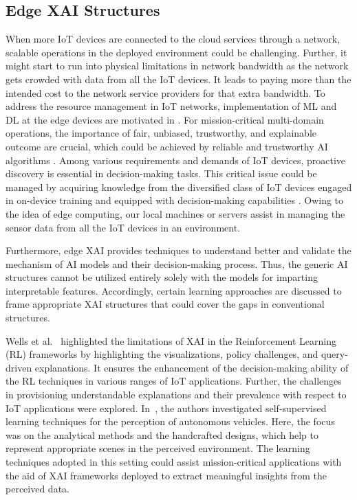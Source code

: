 \documentclass[journal]{IEEEtran}
\begin{document}

\subsection{Edge XAI Structures}
When more IoT devices are connected to the cloud services through a network, scalable operations in the deployed environment could be challenging. Further, it might start to run into physical limitations in network bandwidth as the network gets crowded with data from all the IoT devices. It leads to paying more than the intended cost to the network service providers for that extra bandwidth. To address the resource management in IoT networks, implementation of ML and DL at the edge devices are motivated in \cite{hussain2020machine}. For mission-critical multi-domain operations, the importance of fair, unbiased, trustworthy, and explainable outcome are crucial, which could be achieved by reliable and trustworthy AI algorithms \cite{rawat2021secure}. Among various requirements and demands of IoT devices, proactive discovery is essential in decision-making tasks. This critical issue could be managed by acquiring knowledge from the diversified class of IoT devices engaged in on-device training and equipped with decision-making capabilities \cite{yao2019recommendations}. Owing to the idea of edge computing, our local machines or servers assist in managing the sensor data from all the IoT devices in an environment. 

Furthermore, edge XAI provides techniques to understand better and validate the mechanism of AI models and their decision-making process. Thus, the generic AI structures cannot be utilized entirely solely with the models for imparting interpretable features. Accordingly, certain learning approaches are discussed to frame appropriate XAI structures that could cover the gaps in conventional structures.

Wells et al.~\cite{wells2021explainable} highlighted the limitations of XAI in the Reinforcement Learning (RL) frameworks by highlighting the visualizations, policy challenges, and query-driven explanations. It ensures the enhancement of the decision-making ability of the RL techniques in various ranges of IoT applications. Further, the challenges in provisioning understandable explanations and their prevalence with respect to IoT applications were explored. In~\cite{chiaroni2020self}, the authors investigated self-supervised learning techniques for the perception of autonomous vehicles. Here, the focus was on the analytical methods and the handcrafted designs, which help to represent appropriate scenes in the perceived environment. The learning techniques adopted in this setting could assist mission-critical applications with the aid of XAI frameworks deployed to extract meaningful insights from the perceived data.
\end{document}

